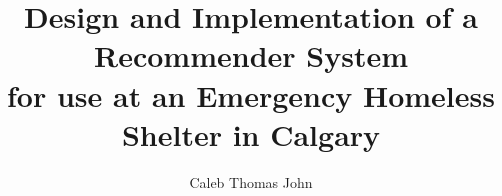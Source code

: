 \documentclass{ucalgarythesis}
\theoremstyle{plain}
\theoremstyle{definition}
\newcommand{\Abb}[0]{RuGRATS }
\begin{document}


  \title{
  Design and Implementation of a Recommender System \\for use at an Emergency Homeless Shelter in Calgary
   }
   
  \author{Caleb Thomas John}
  

  \frontmatter           %
  \makethesistitle       %


\end{document}
